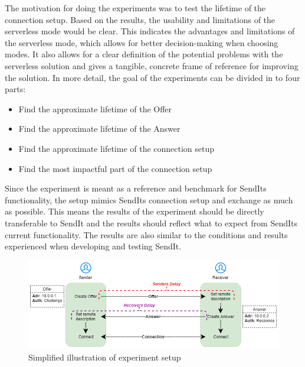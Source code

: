 The motivation for doing the experiments was to test the lifetime of the connection setup. Based on the results, the  usability and limitations of the serverless mode would be clear. This indicates the advantages and limitations of the serverless mode, which allows for better decision-making when choosing modes. It also allows for a clear definition of the potential problems with the serverless solution and gives a tangible, concrete frame of reference for improving the solution.
In more detail, the goal of the experiments can be divided in to four parts:
%
\begin{itemize}
	\item Find the approximate lifetime of the Offer
	\item Find the approximate lifetime of the Answer
	\item Find the approximate lifetime of the connection setup
	\item Find the most impactful part of the connection setup
\end{itemize}
%
Since the experiment is meant as a reference and benchmark for SendIts functionality, the setup mimics SendIts connection setup and exchange as much as possible. This means the results of the experiment should be directly transferable to SendIt and the results should reflect what to expect from SendIts current functionality. The results are also similar to the conditions and results experienced when developing and testing SendIt.

%
%
\begin{figure}[th]
  \centering
  \includegraphics[width=\textwidth]{Figures/Terms}
  \decoRule
  \caption[Experiment terminology]{Simplified illustration of experiment setup}
  \label{fig:terms}
\end{figure}
%
